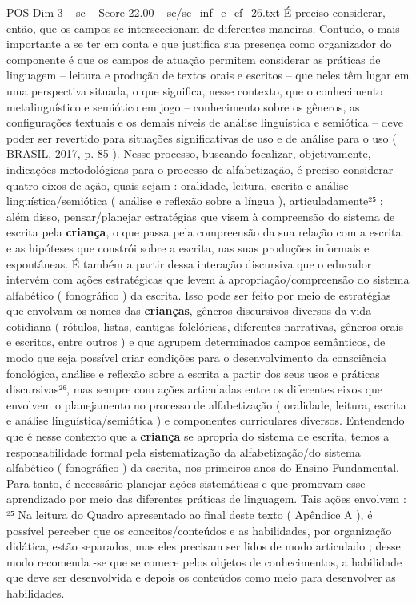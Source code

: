 \begin{textsample}{POS Dim 3 – sc – Score 22.00 – sc/sc\_inf\_e\_ef\_26.txt}
É preciso considerar, então, que os campos se interseccionam de diferentes maneiras.
Contudo, o mais importante a se ter em conta e que justifica sua presença como organizador do componente é que os campos de atuação permitem considerar as práticas de linguagem – leitura e produção de textos orais e escritos – que neles têm lugar em uma perspectiva situada, o que significa, nesse contexto, que o conhecimento metalinguístico e semiótico em jogo – conhecimento sobre os gêneros, as configurações textuais e os demais níveis de análise linguística e semiótica – deve poder ser revertido para situações significativas de uso e de análise para o uso ( BRASIL, 2017, p. 85 ).
Nesse processo, buscando focalizar, objetivamente, indicações metodológicas para o processo de alfabetização, é preciso considerar quatro eixos de ação, quais sejam : oralidade, leitura, escrita e análise linguística/semiótica ( análise e reflexão sobre a língua ), articuladamente²⁵ ; além disso, pensar/planejar estratégias que visem à compreensão do sistema de escrita pela \textbf{criança}, o que passa pela compreensão da sua relação com a escrita e as hipóteses que constrói sobre a escrita, nas suas produções informais e espontâneas.
É também a partir dessa interação discursiva que o educador intervém com ações estratégicas que levem à apropriação/compreensão do sistema alfabético ( fonográfico ) da escrita.
Isso pode ser feito por meio de estratégias que envolvam os nomes das \textbf{crianças}, gêneros discursivos diversos da vida cotidiana ( rótulos, listas, cantigas folclóricas, diferentes narrativas, gêneros orais e escritos, entre outros ) e que agrupem determinados campos semânticos, de modo que seja possível criar condições para o desenvolvimento da consciência fonológica, análise e reflexão sobre a escrita a partir dos seus usos e práticas discursivas²⁶, mas sempre com ações articuladas entre os diferentes eixos que envolvem o planejamento no processo de alfabetização ( oralidade, leitura, escrita e análise linguística/semiótica ) e componentes curriculares diversos.
Entendendo que é nesse contexto que a \textbf{criança} se apropria do sistema de escrita, temos a responsabilidade formal pela sistematização da alfabetização/do sistema alfabético ( fonográfico ) da escrita, nos primeiros anos do Ensino Fundamental.
Para tanto, é necessário planejar ações sistemáticas e que promovam esse aprendizado por meio das diferentes práticas de linguagem.
Tais ações envolvem : ²⁵ Na leitura do Quadro apresentado ao final deste texto ( Apêndice A ), é possível perceber que os conceitos/conteúdos e as habilidades, por organização didática, estão separados, mas eles precisam ser lidos de modo articulado ; desse modo recomenda -se que se comece pelos objetos de conhecimentos, a habilidade que deve ser desenvolvida e depois os conteúdos como meio para desenvolver as habilidades.

\end{textsample}
